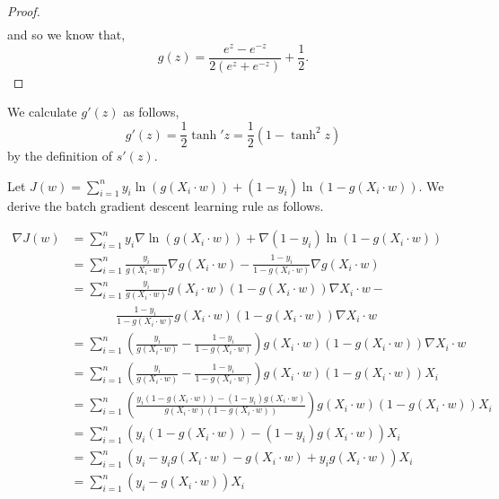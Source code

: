 \documentclass[letter]{article}
\newenvironment{menumerate}{%
  \edef\backupindent{\the\parindent}%
  \enumerate%
  \setlength{\parindent}{\backupindent}%
}{\endenumerate}
\begin{document}
\begin{menumerate}
\begin{menumerate}
\begin{proof}
\begin{equation*}
\begin{aligned}
 				\end{aligned}
 			\end{equation*}
 			and so we know that, 
 			 		\begin{equation}
 			g(z) = \frac{e^z - e^{-z}}{2(e^z + e^{-z})} + \frac{1}{2}.
 		\end{equation} 	
 		\end{proof}
	\item We calculate $g'(z)$ as follows,
	\begin{equation*}
		g'(z) = \frac{1}{2}\tanh' z = \frac{1}{2}\left(1 - \tanh^2 z\right)  
	\end{equation*}
	by the definition of $s'(z).$
	\item Let $J(w) = \sum_{i=1}^n y_i \ln(g(X_i \cdot w)) + (1- y_i)\ln(1 - g(X_i \cdot w))$.  We derive the batch gradient descent learning rule as follows.

  \begin{equation*}
    \begin{aligned}
      \nabla J(w) &= \sum_{i=1}^n y_i \nabla \ln(g(X_i \cdot w)) + \nabla (1 - y_i) \ln (1 - g(X_i \cdot w)) \\
      &=   \sum_{i=1}^n \frac{y_i}{g(X_i \cdot w)} \nabla g(X_i \cdot w) - \frac{1-y_i}{1 - g(X_i \cdot w)} \nabla g(X_i \cdot w) \\
      &= \sum_{i=1}^n \frac{y_i}{g(X_i \cdot w)} g(X_i \cdot w)(1- g(X_i \cdot w))\nabla X_i \cdot w - \\& \;\;\;\;\;\;\;\;\;\;\;\;\;\frac{1-y_i}{1 - g(X_i \cdot w)} g(X_i \cdot w) (1 - g(X_i \cdot w))\nabla X_i \cdot w \\
      &= \sum_{i=1}^n  \left(\frac{y_i}{g(X_i \cdot w)} - \frac{1-y_i}{1 - g(X_i \cdot w)}\right) g(X_i \cdot w) (1 - g(X_i \cdot w))\nabla X_i \cdot w \\
      &=  \sum_{i=1}^n  \left(\frac{y_i}{g(X_i \cdot w)} - \frac{1-y_i}{1 - g(X_i \cdot w)}\right) g(X_i \cdot w) (1 - g(X_i \cdot w))X_i \\
      &= \sum_{i=1}^n  \left(\frac{y_i(1 - g(X_i \cdot w))  - (1-y_i)g(X_i \cdot w)}{g(X_i \cdot w)(1 - g(X_i \cdot w))} \right) g(X_i \cdot w) (1 - g(X_i \cdot w))X_i \\
      &= \sum_{i=1}^n  \left(y_i(1 - g(X_i \cdot w))  - (1-y_i)g(X_i \cdot w)\right)X_i \\
      &= \sum_{i=1}^n  \left(y_i - y_ig(X_i \cdot w)  - g(X_i \cdot w) + y_ig(X_i \cdot w)\right)X_i \\
      &= \sum_{i=1}^n  \left(y_i  - g(X_i \cdot w)\right)X_i \\
    \end{aligned}
  \end{equation*}


\end{menumerate}
\end{menumerate}
\end{document}
